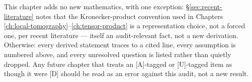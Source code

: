 \begin{ledgerentry}
This chapter adds no new mathematics, with one exception: \S\ref{sec:recent-literature}
notes that the Kronecker-product convention used in Chapters
\ref{ch:local-tomography}--\ref{ch:tensor-product} is a representation
choice, not a forced one, per recent literature — itself an audit-relevant
fact, not a new derivation. Otherwise: every derived statement traces to a
cited line, every assumption is numbered above, and every unresolved
question is listed rather than quietly dropped. Any future chapter that
treats an [A]-tagged or [U]-tagged item as though it were [D] should be read
as an error against this audit, not a new result.
\end{ledgerentry}

